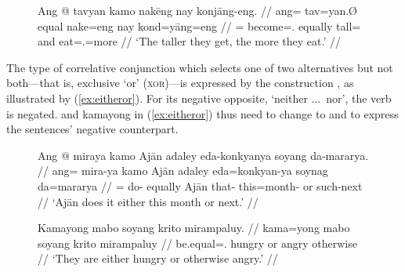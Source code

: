 \begin{figure}[h]
\ex\label{ex:thethe}
\begingl
	\gla Ang @ tavyan kamo nakēng nay konjāng-eng. //
	\glb ang= tav=yan.Ø equal nake=eng nay kond=yāng=eng //
	\glc \AgtT{}= become=\TsgM{}.\Top{} equally tall=\Comp{} and 
		eat=\TsgM{}.\Aarg{}=more //
	\glft `The taller they get, the more they eat.' //
\endgl
\xe
\end{figure}

The type of correlative conjunction which selects one of two alternatives but
not both---that is, exclusive `or' (\textsc{xor})---is expressed by the
construction , as
illustrated by (\ref{ex:eitheror}). For its negative opposite, `neither ...\
nor', the verb is negated.  and 
{kamayong} in (\ref{ex:eitheror}) thus need to change to 
and \rayr{kmojyoNF}{kamoyyong} to express the sentences' negative counterpart.

\begin{figure}[h]
\pex\label{ex:eitheror}
\a\label{ex:eitherorvb}\begingl
	\gla Ang @ miraya kamo Ajān adaley eda-konkyanya soyang da-mararya. //
	\glb ang= mira-ya kamo Ajān adaley eda=konkyan-ya soynag da=mararya //
	\glc \AgtT{}= do-\TsgM{} equally Ajān that-\PargI{} this=month-\Loc{} 
		or such-next //
	\glft `Ajān does it either this month or next.' //
\endgl

\a\label{ex:eitherorpred}\begingl
	\gla Kamayong mabo soyang krito mirampaluy. //
	\glb kama=yong mabo soyang krito mirampaluy //
	\glc be.equal=\TsgN{}.\Aarg{} hungry or angry otherwise //
	\glft `They are either hungry or otherwise angry.' //
\endgl

\xe
\end{figure}



